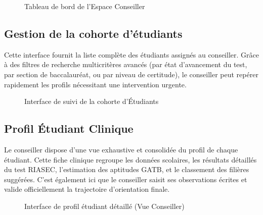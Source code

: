 \begin{figure}[H]
    \centering
    \caption{Tableau de bord de l'Espace Conseiller}
    \label{fig:interface_dashboard_counselor}
\end{figure}

\subsection{Gestion de la cohorte d'étudiants}

Cette interface fournit la liste complète des étudiants assignés au conseiller. Grâce à des filtres de recherche multicritères avancés (par état d'avancement du test, par section de baccalauréat, ou par niveau de certitude), le conseiller peut repérer rapidement les profils nécessitant une intervention urgente.

\begin{figure}[H]
    \centering
    \caption{Interface de suivi de la cohorte d'Étudiants}
    \label{fig:interface_students_list}
\end{figure}

\subsection{Profil Étudiant Clinique}

Le conseiller dispose d'une vue exhaustive et consolidée du profil de chaque étudiant. Cette fiche clinique regroupe les données scolaires, les résultats détaillés du test RIASEC, l'estimation des aptitudes GATB, et le classement des filières suggérées. C'est également ici que le conseiller saisit ses observations écrites et valide officiellement la trajectoire d'orientation finale.

\begin{figure}[H]
    \centering
    \caption{Interface de profil étudiant détaillé (Vue Conseiller)}
    \label{fig:interface_student_profile_counselor}
\end{figure}

